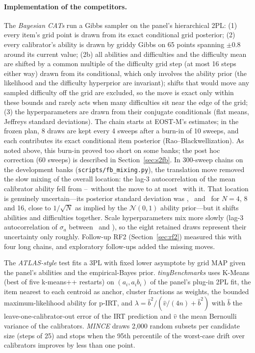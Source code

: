 \paragraph{Implementation of the competitors.} The \emph{Bayesian CATs} run a Gibbs sampler on the
panel's hierarchical 2PL: (1) every item's grid point is drawn from its exact conditional
grid posterior; (2) every calibrator's ability is drawn by griddy Gibbs on 65 points
spanning $\pm0.8$ around its current value; (2b) all abilities and difficulties and the
difficulty mean are shifted by a common multiple of the difficulty grid step (at most 16
steps either way) drawn from its conditional, which only involves the ability prior (the
likelihood and the difficulty hyperprior are invariant); shifts that would move any
sampled difficulty off the grid are excluded, so the move is exact only within these
bounds and rarely acts when many difficulties sit near the edge of the grid; (3) the
hyperparameters are drawn from their conjugate conditionals (flat means, Jeffreys standard
deviations). The chain starts at EOST-M's estimates; in the frozen plan, 8 draws are kept
every 4 sweeps after a burn-in of 10 sweeps, and each contributes its exact conditional item
posterior (Rao--Blackwellization). As noted above, this burn-in proved too short on some banks; the
post hoc correction (60 sweeps) is described in Section~\ref{sec:s2fb}. In 300-sweep chains on the
development banks (\texttt{scripts/fb\_mixing.py}), the translation move removed the slow
mixing of the overall location: the lag-3 autocorrelation of the mean calibrator ability
fell from \MixLocWithoutMin--\MixLocWithoutMax\ without the move to at most \MixLocWithMax\
with it. That location is genuinely uncertain---its posterior standard deviation was
\MixLocSdFour, \MixLocSdEight\ and \MixLocSdSixteen\ for $N=4$, 8 and 16, close to
$1/\sqrt N$ as implied by the $\mathcal N(0,1)$ ability prior---but it shifts abilities and
difficulties together. Scale hyperparameters mix more slowly (lag-3 autocorrelation of
$\sigma_a$ between \MixScaleMin\ and \MixScaleMax), so the eight retained draws represent
their uncertainty only roughly. Follow-up RF2 (Section~\ref{sec:rf2}) measured this with
four long chains, and exploratory follow-ups added the missing moves.

The \emph{ATLAS-style} test fits a 3PL with fixed lower asymptote by grid MAP given the
panel's abilities and the empirical-Bayes prior. \emph{tinyBenchmarks} uses K-Means (best of
five k-means++ restarts) on $(a_i,a_ib_i)$ of the panel's plug-in 2PL fit, the item nearest
to each centroid as anchor, cluster fractions as weights, the bounded maximum-likelihood
ability for p-IRT, and $\lambda=\hat b^2/(\hat v/(4n)+\hat b^2)$ with $\hat b$ the
leave-one-calibrator-out error of the IRT prediction and $\hat v$ the mean Bernoulli
variance of the calibrators. \emph{MINCE} draws 2,000 random subsets per candidate size
(steps of 25) and stops when the 95th percentile of the worst-case drift over calibrators
improves by less than one point.

